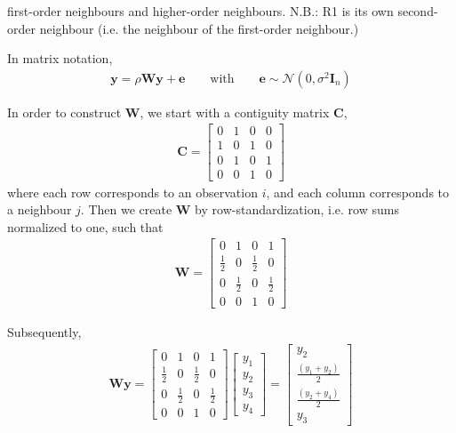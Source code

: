 \noindent first-order neighbours and higher-order neighbours. N.B.: R1 is its own second-order neighbour (i.e. the neighbour of the first-order neighbour.)

In matrix notation,
\begin{eqnarray}
\boldsymbol{y} = \rho\boldsymbol{Wy} + \boldsymbol{e} \qquad \text{with} \qquad \boldsymbol{e} \sim\mathcal{N}(0,\sigma^{2}\boldsymbol{I}_n)
\end{eqnarray}

In order to construct $\boldsymbol{W}$, we start with a contiguity matrix $\boldsymbol{C}$,
\begin{eqnarray}
\boldsymbol{C} = 
\begin{bmatrix}
  0 & 1 & 0 & 0\\
  1 & 0 & 1 & 0\\
  0 & 1 & 0 & 1\\
  0 & 0 & 1 & 0
\end{bmatrix}
\end{eqnarray}
\noindent where each row corresponds to an observation $i$, and each column corresponds to a neighbour $j$. Then we create $\boldsymbol{W}$ by row-standardization, i.e. row sums normalized to one, such that
\begin{eqnarray}
\boldsymbol{W} = 
\begin{bmatrix}
  0 & 1 & 0 & 1\\
  \frac{1}{2} & 0 & \frac{1}{2} & 0\\
  0 & \frac{1}{2} & 0 & \frac{1}{2}\\
  0 & 0 & 1 & 0
\end{bmatrix}
\end{eqnarray}

Subsequently,
\begin{eqnarray}
\boldsymbol{W}\boldsymbol{y} =
\begin{bmatrix}
  0 & 1 & 0 & 1\\
  \frac{1}{2} & 0 & \frac{1}{2} & 0\\
  0 & \frac{1}{2} & 0 & \frac{1}{2}\\
  0 & 0 & 1 & 0
\end{bmatrix}
\begin{bmatrix}
  y_{1}\\
  y_{2}\\
  y_{3}\\
  y_{4}
\end{bmatrix}
=
\begin{bmatrix}
  y_{2}\\
  \frac{(y_{1} + y_{2})}{2}\\
  \frac{(y_{2} + y_{4})}{2}\\
  y_{3}
\end{bmatrix}
\end{eqnarray}

